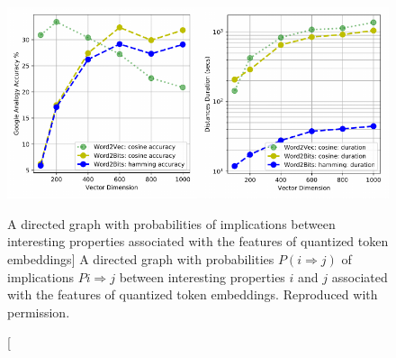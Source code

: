 \begin{figure}
\includegraphics{word2bits-speed}
\vspace{-0.8cm}
\caption
  [A directed graph with probabilities of implications between interesting
   properties associated with the features of quantized token embeddings]%
  {A directed graph with probabilities $P(i ⇒ j)$ of implications $Pi ⇒ j$ 
   between interesting properties $i$ and $j$ associated with the features
   of quantized token embeddings. Reproduced with permission.
   \cite[Figure B.1]{stefanik2019semantic}}
\label{fig:formal-concept-analysis-with-quantized-token-embeddings}
\end{figure}